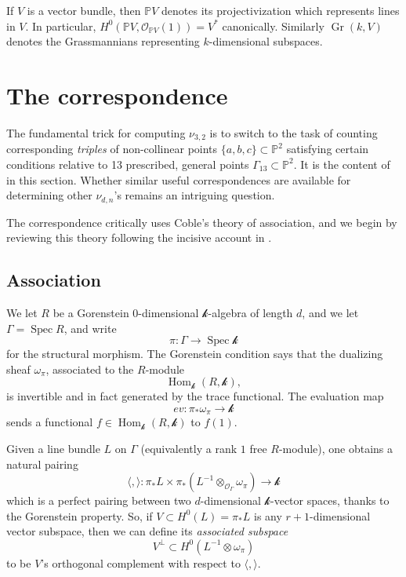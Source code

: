 \documentclass{article}
\renewcommand{\P}{\mathbb{P}}
\renewcommand{\k}{\mathscr{k}}
\DeclareMathOperator{\Spec}{Spec }
\DeclareMathOperator{\Hom}{Hom}
\renewcommand{\O}{\mathcal{O}}
\DeclareMathOperator{\Gr}{Gr}
\begin{document}
If $V$ is a vector bundle, then $\P V$ denotes its projectivization which represents lines in $V$.  In particular, $H^{0}(\P V, \O_{\P V}(1)) = V^{*}$ canonically.  Similarly $\Gr(k,V)$ denotes the Grassmannians representing $k$-dimensional subspaces.


\section{The correspondence}
\label{sec:translation}

The fundamental trick for computing $\nu_{3,2}$ is to switch to the task of counting corresponding {\sl triples} of
non-collinear points $\{a,b,c\} \subset \P^2$ satisfying certain conditions
relative to 13 prescribed, general points $\Gamma_{13} \subset \P^2$.  It is the content of  in this section.  Whether
 similar useful correspondences are available for determining other $\nu_{d,n}$'s remains an intriguing question.  
 
 The correspondence critically uses Coble's theory of association, and we begin by
reviewing this theory following the incisive account in \cite{EISENBUD2000127}.  

\subsection{Association}
\label{sec:association}


We let $R$ be a Gorenstein $0$-dimensional $\k$-algebra of length $d$,
and we let $\Gamma = \Spec R$, and write \[\pi: \Gamma \to \Spec \k\] for
the structural morphism.  The Gorenstein condition says that the dualizing sheaf $\omega_{\pi}$,
associated to the $R$-module
\[ \Hom_{\k}(R,\k),\] is invertible and in fact generated by the trace
functional. The evaluation map
\[ev: \pi_{*}\omega_{\pi} \to \k\] sends a functional 
$f \in \Hom_{\k}(R,\k)$ to $f(1)$.

Given a line bundle $L$ on $\Gamma$ (equivalently a rank $1$
free $R$-module), one obtains a natural pairing
\[\langle, \rangle: \pi_{*}L \times 
  \pi_{*}\left( L^{-1} \otimes_{\O_{\Gamma}}
    \omega_{\pi}\right) \to \k \] which is a perfect pairing between
two $d$-dimensional $\k$-vector spaces, thanks to the Gorenstein
property.  So, if
$V \subset H^{0}(L) = \pi_{*}L$ is any
$r+1$-dimensional vector subspace,  then we can define its {\sl
  associated subspace}
\[V^{\perp} \subset H^{0}(L^{-1}\otimes \omega_{\pi})\] to be $V$'s orthogonal complement with respect to $\langle, \rangle$.
\end{document}
